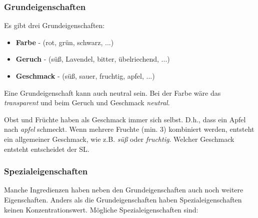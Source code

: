 \subsubsection{Grundeigenschaften}
Es gibt drei Grundeigenschaften:
\begin{itemize}
\item \textbf{Farbe} - (rot, grün, schwarz, ...)
\item \textbf{Geruch} - (süß, Lavendel, bitter, übelriechend, ...)
\item \textbf{Geschmack} - (süß, sauer, fruchtig, apfel, ...)
\end{itemize}

Eine Grundeigenschaft kann auch neutral sein. Bei der Farbe wäre das \textit{transparent} und beim Geruch und Geschmack \textit{neutral}. 

Obst und Früchte haben als Geschmack immer sich selbst. D.h., dass ein Apfel nach \textit{apfel} schmeckt. Wenn mehrere Fruchte (min. 3) kombiniert werden, entsteht ein allgemeiner Geschmack, wie z.B. \textit{süß} oder \textit{fruchtig}. Welcher Geschmack entsteht entscheidet der SL.

\subsubsection{Spezialeigenschaften}
\label{chap:spezialeigenschaften}
Manche Ingredienzen haben neben den Grundeigenschaften auch noch weitere Eigenschaften. Anders als die Grundeigenschaften haben Spezialeigenschaften keinen Konzentrationswert. Mögliche Spezialeigenschaften sind:

